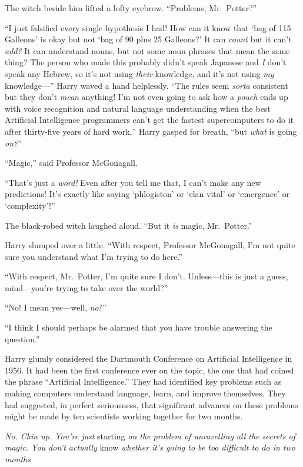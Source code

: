The witch beside him lifted a lofty eyebrow. ``Problems, Mr.~Potter?''

``I just falsified every single hypothesis I had! How can it know that
`bag of 115 Galleons' is okay but not `bag of 90 plus 25 Galleons?' It
can \emph{count} but it can't \emph{add?} It can understand nouns, but
not some noun phrases that mean the same thing? The person who made this
probably didn't speak Japanese and \emph{I} don't speak any Hebrew, so
it's not using \emph{their} knowledge, and it's not using \emph{my}
knowledge---'' Harry waved a hand helplessly. ``The rules seem
\emph{sorta} consistent but they don't \emph{mean} anything! I'm not
even going to ask how a \emph{pouch} ends up with voice recognition and
natural language understanding when the best Artificial Intelligence
programmers can't get the fastest supercomputers to do it after
thirty-five years of hard work,'' Harry gasped for breath, ``but
\emph{what} is going \emph{on?}''

``Magic,'' said Professor McGonagall.

``That's just a \emph{word!} Even after you tell me that, I can't make
any new predictions! It's exactly like saying `phlogiston' or `elan
vital' or `emergence' or `complexity'!''

The black-robed witch laughed aloud. ``But it \emph{is} magic,
Mr.~Potter.''

Harry slumped over a little. ``With respect, Professor McGonagall, I'm
not quite sure you understand what I'm trying to do here.''

``With respect, Mr.~Potter, I'm quite sure I don't. Unless---this is
just a guess, mind---you're trying to take over the world?''

``No! I mean yes---well, \emph{no!''}

``I think I should perhaps be alarmed that you have trouble answering
the question.''

Harry glumly considered the Dartmouth Conference on Artificial
Intelligence in 1956. It had been the first conference ever on the
topic, the one that had coined the phrase ``Artificial Intelligence.''
They had identified key problems such as making computers understand
language, learn, and improve themselves. They had suggested, in perfect
seriousness, that significant advances on these problems might be made
by ten scientists working together for two months.

\emph{No. Chin up. You're just} starting \emph{on the problem of
unravelling all the secrets of magic. You don't actually} know
\emph{whether it's going to be too difficult to do in two months.}

